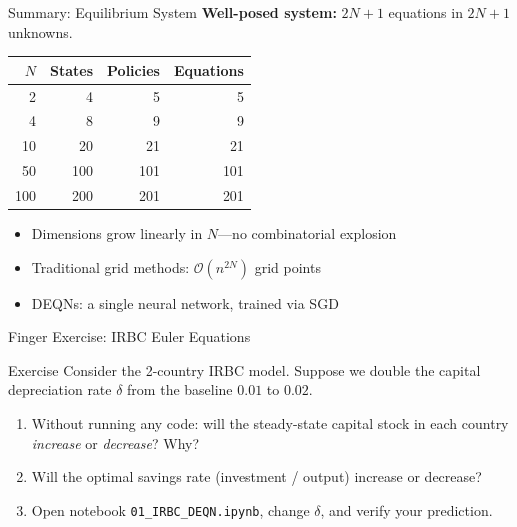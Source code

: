 \documentclass[aspectratio=169,11pt]{beamer}
\newcommand{\emphc}[1]{\textcolor{harvardcrimson}{#1}}
\begin{document}
\begin{frame}{Summary: Equilibrium System}
\textbf{Well-posed system:} $2N+1$ equations in $2N+1$ unknowns.

\vspace{0.5em}
\begin{center}
\begin{tabular}{rrrr}
\toprule
$N$ & \textbf{States} & \textbf{Policies} & \textbf{Equations} \\
\midrule
2 & 4 & 5 & 5 \\
4 & 8 & 9 & 9 \\
10 & 20 & 21 & 21 \\
50 & 100 & 101 & 101 \\
100 & 200 & 201 & 201 \\
\bottomrule
\end{tabular}
\end{center}

\vspace{0.3em}
\begin{itemize}
    \item Dimensions grow \emphc{linearly} in $N$---no combinatorial explosion
    \item Traditional grid methods: $\mathcal{O}(n^{2N})$ grid points
    \item DEQNs: a single neural network, trained via SGD
\end{itemize}
\end{frame}

\begin{frame}{\exercisepause{} Finger Exercise: IRBC Euler Equations}
\begin{exampleblock}{Exercise}
Consider the 2-country IRBC model. Suppose we \emphc{double} the capital depreciation rate $\delta$ from the baseline $0.01$ to $0.02$.
\begin{enumerate}
    \item Without running any code: will the steady-state capital stock in each country \emph{increase} or \emph{decrease}? Why?
    \item Will the optimal savings rate (investment / output) increase or decrease?
    \item Open notebook \texttt{01\_IRBC\_DEQN.ipynb}, change $\delta$, and verify your prediction.
\end{enumerate}
\end{exampleblock}
\end{frame}
\end{document}
